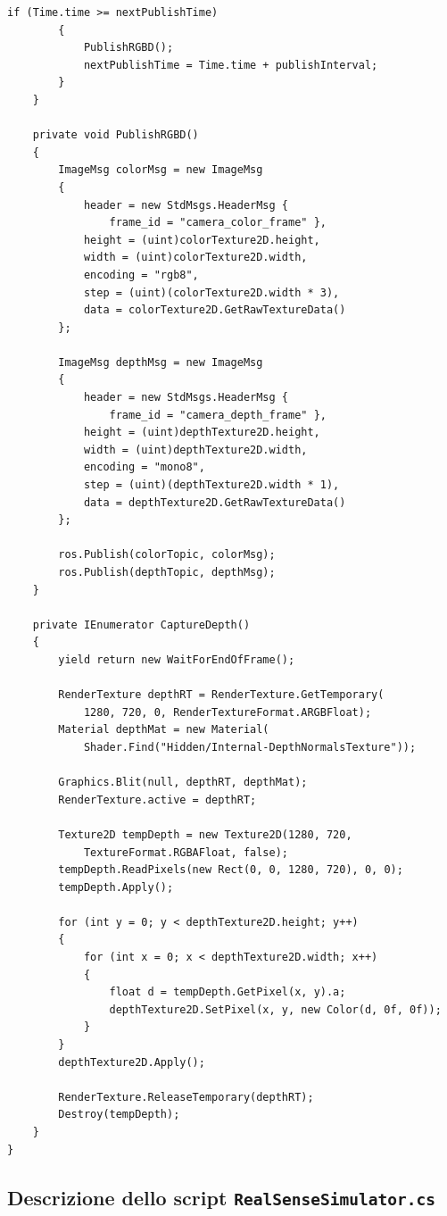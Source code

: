 \documentclass[11pt]{report}
\begin{document}
\begin{lstlisting}[caption=Integrazione dello script di Ros2, label=lst:base, lineskip=0.3em]
        if (Time.time >= nextPublishTime)
        {
            PublishRGBD();
            nextPublishTime = Time.time + publishInterval;
        }
    }

    private void PublishRGBD()
    {
        ImageMsg colorMsg = new ImageMsg
        {
            header = new StdMsgs.HeaderMsg { 
                frame_id = "camera_color_frame" },
            height = (uint)colorTexture2D.height,
            width = (uint)colorTexture2D.width,
            encoding = "rgb8",
            step = (uint)(colorTexture2D.width * 3),
            data = colorTexture2D.GetRawTextureData()
        };

        ImageMsg depthMsg = new ImageMsg
        {
            header = new StdMsgs.HeaderMsg { 
                frame_id = "camera_depth_frame" },
            height = (uint)depthTexture2D.height,
            width = (uint)depthTexture2D.width,
            encoding = "mono8",
            step = (uint)(depthTexture2D.width * 1),
            data = depthTexture2D.GetRawTextureData()
        };

        ros.Publish(colorTopic, colorMsg);
        ros.Publish(depthTopic, depthMsg);
    }

    private IEnumerator CaptureDepth()
    {
        yield return new WaitForEndOfFrame();
        
        RenderTexture depthRT = RenderTexture.GetTemporary(
            1280, 720, 0, RenderTextureFormat.ARGBFloat);
        Material depthMat = new Material(
            Shader.Find("Hidden/Internal-DepthNormalsTexture"));
        
        Graphics.Blit(null, depthRT, depthMat);
        RenderTexture.active = depthRT;
        
        Texture2D tempDepth = new Texture2D(1280, 720, 
            TextureFormat.RGBAFloat, false);
        tempDepth.ReadPixels(new Rect(0, 0, 1280, 720), 0, 0);
        tempDepth.Apply();

        for (int y = 0; y < depthTexture2D.height; y++)
        {
            for (int x = 0; x < depthTexture2D.width; x++)
            {
                float d = tempDepth.GetPixel(x, y).a;
                depthTexture2D.SetPixel(x, y, new Color(d, 0f, 0f));
            }
        }
        depthTexture2D.Apply();

        RenderTexture.ReleaseTemporary(depthRT);
        Destroy(tempDepth);
    }
}
\end{lstlisting}
\subsection{Descrizione dello script \texttt{RealSenseSimulator.cs}}
\end{document}
